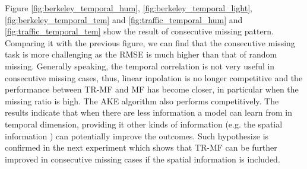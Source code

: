 Figure \ref{fig:berkeley_temporal_hum}, \ref{fig:berkeley_temporal_light}, \ref{fig:berkeley_temporal_tem} and \ref{fig:traffic_temporal_hum} and \ref{fig:traffic_temporal_tem} show the result of consecutive missing pattern. Comparing it with the previous figure, we can find that the consecutive missing task is more challenging as the RMSE is much higher than that of random missing.
Generally speaking, the temporal correlation is not very useful in consecutive missing cases, thus, linear inpolation is no longer competitive and the performance between TR-MF and MF has become closer, in particular when the missing ratio is high. The AKE algorithm also performs competitively. The results indicate that when there are less information a model can learn from in temporal dimension, providing it other kinds of information (e.g. the spatial information ) can potentially improve the outcomes. Such hypothesize is confirmed in the next experiment which shows that TR-MF can be further improved in consecutive missing cases if the spatial information is included. 


